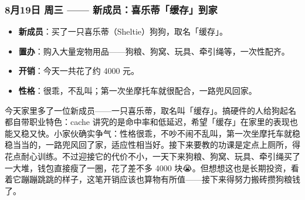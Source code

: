 \subsubsection{8月19日 周三 —— 新成员：喜乐蒂「缓存」到家}

\begin{itemize}
  \item \textbf{新成员}：买了一只喜乐蒂（Sheltie）狗狗，取名「缓存」。
  \item \textbf{置办}：购入大量宠物用品——狗粮、狗窝、玩具、牵引绳等，一次性配齐。
  \item \textbf{开销}：今天一共花了约 4000 元。
  \item \textbf{性格}：很乖，不乱叫；第一次坐摩托车就很配合，一路兜风回家。
\end{itemize}

\begin{personalnote}
今天家里多了一位新成员——一只喜乐蒂，取名叫「缓存」。搞硬件的人给狗起名都自带职业特色：cache 讲究的是命中率和低延迟，希望「缓存」在家里的表现也能又稳又快。小家伙确实争气：性格很乖，不吵不闹不乱叫，第一次坐摩托车就稳稳当当的，一路兜风回了家，适应性相当好。接下来要教的功课是定点上厕所，得花点耐心训练。不过迎接它的代价不小，一天下来狗粮、狗窝、玩具、牵引绳买了一大堆，钱包直接瘦了一圈，花了差不多 4000 块😭。但想想这也是长期投资，看着它蹦蹦跳跳的样子，这笔开销应该也算物有所值——接下来得努力搬砖攒狗粮钱了。
\end{personalnote}
